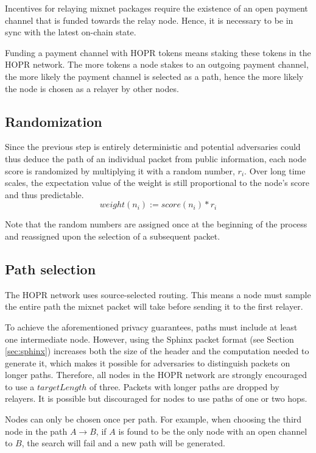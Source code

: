 Incentives for relaying mixnet packages require the existence of an open payment channel that is funded towards the relay node. Hence, it is necessary to be in sync with the latest on-chain state.

Funding a payment channel with HOPR tokens means staking these tokens in the HOPR network. The more tokens a node stakes to an outgoing payment channel, the more likely the payment channel is selected as a path, hence the more likely the node is chosen as a relayer by other nodes.

\subsection{Randomization}
\label{sec:path-selection:randomization}

Since the previous step is entirely deterministic and potential adversaries could thus deduce the path of an individual packet from public information, each node score is randomized by multiplying it with a random number, $r_i$. Over long time scales, the expectation value of the weight is still proportional to the node's score and thus predictable.
$$weight(n_i) := score(n_i) * r_i$$

Note that the random numbers are assigned once at the beginning of the process and reassigned upon the selection of a subsequent packet.

\subsection{Path selection}
\label{sec:path-selection:graph-traversal}

The HOPR network uses source-selected routing. This means a node must sample the entire path the mixnet packet will take before sending it to the first relayer.

To achieve the aforementioned privacy guarantees, paths must include at least one intermediate node. However, using the Sphinx packet format (see Section \ref{sec:sphinx}) increases both the size of the header and the computation needed to generate it, which makes it possible for adversaries to distinguish packets on longer paths. Therefore, all nodes in the HOPR network are strongly encouraged to use a $targetLength$ of three. Packets with longer paths are dropped by relayers. It is possible but discouraged for nodes to use paths of one or two hops.

Nodes can only be chosen once per path. For example, when choosing the third node in the path $A\rightarrow B$, if $A$ is found to be the only node with an open channel to $B$, the search will fail and a new path will be generated.

